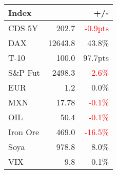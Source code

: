 \documentclass[article,crop=false]{standalone}%
\begin{document}
%
\scriptsize%
\renewcommand{\arraystretch}{1.2}%
\setlength{\tabcolsep}{0.15cm}%
\begin{tabular}{l  r  r  }%
\hline%
\textbf{Index}&\textbf{}&\textbf{+/{-}}\\%
\hline%
CDS 5Y&202.7&\textcolor{red}{ 
{-}0.9pts
}\\%
DAX&12643.8&43.8\%\\%
T{-}10&100.0&97.7pts\\%
S\&P Fut&2498.3&\textcolor{red}{ 
{-}2.6\%
}\\%
EUR&1.2&0.0\%\\%
MXN&17.78&\textcolor{red}{ 
{-}0.1\%
}\\%
OIL&50.4&\textcolor{red}{ 
{-}0.1\%
}\\%
Iron Ore&469.0&\textcolor{red}{ 
{-}16.5\%
}\\%
Soya&978.8&8.0\%\\%
VIX&9.8&0.1\%\\%
\hline%
\end{tabular}%
\end{document}
